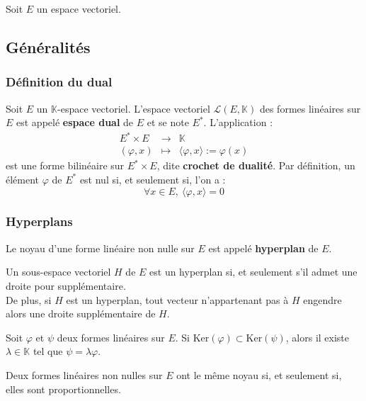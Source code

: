 \documentclass[french]{article}
\newcommand{\K}{\mathbb{K}}
\newcommand{\st}{^*}
\renewcommand{\ker}{\text{Ker}}
\theoremstyle{plain}
\theoremstyle{definition}
\theoremstyle{remark}
\begin{document}
Soit $E$ un espace vectoriel.

\subsection{Généralités}

\subsubsection*{Définition du dual}

Soit $E$ un $\K$-espace vectoriel. L'espace vectoriel $\mathcal{L}(E,\K)$ des formes linéaires sur $E$ est appelé \textbf{espace dual} de $E$ et se note $E\st$. L'application : $$\begin{array}{rcl}
	E\st\times E&\longrightarrow&\K\\
	(\varphi,x)&\longmapsto&\langle\varphi,x\rangle:=\varphi(x)
\end{array}$$ est une forme bilinéaire sur $E\st\times E$, dite \textbf{crochet de dualité}. Par définition, un élément $\varphi$ de $E\st$ est nul si, et seulement si, l'on a : $$\forall x\in E,\ \langle\varphi,x\rangle=0$$

\subsubsection*{Hyperplans}
\begin{dfn}
	Le noyau d'une forme linéaire non nulle sur $E$ est appelé \textbf{hyperplan} de $E$.
\end{dfn}

\begin{prop}%
	Un sous-espace vectoriel $H$ de $E$ est un hyperplan si, et seulement s'il admet une droite pour supplémentaire. \\
	De plus, si $H$ est un hyperplan, tout vecteur n'appartenant pas à $H$ engendre alors une droite supplémentaire de $H$.
\end{prop}

\begin{lem}%
	Soit $\varphi$ et $\psi$ deux formes linéaires sur $E$. Si $\ker(\varphi)\subset\ker(\psi)$, alors il existe $\lambda\in\K$ tel que $\psi=\lambda\varphi$.
\end{lem}

\begin{prop}%
	Deux formes linéaires non nulles sur $E$ ont le même noyau si, et seulement si, elles sont proportionnelles.
\end{prop}
\end{document}

